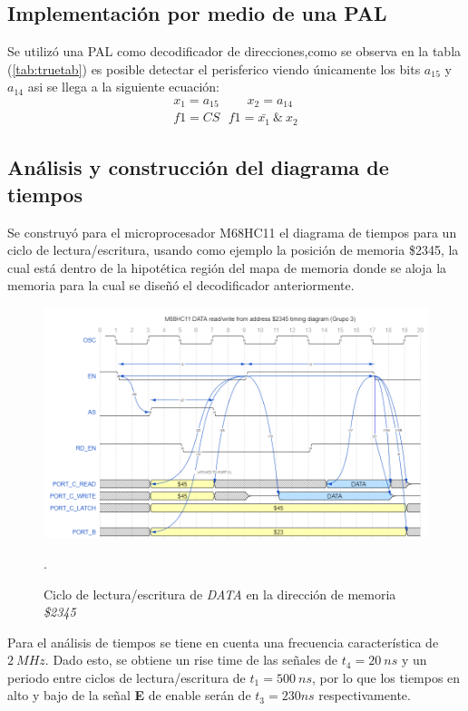 \subsection{Implementación por medio de una PAL}
Se utilizó una PAL como decodificador de direcciones,como se observa en la tabla (\ref{tab:truetab}) es posible detectar el perisferico viendo únicamente los bits $a_{15}$ y $a_{14}$ asi se llega a la siguiente ecuación:
\begin{align}
x_1 = a_{15} \ \ \  \  \  \  \  \  \  \ x_2=a_{14} \\
f1=CS \ \ \ f1= \bar{x_1} \  \&  \ x_2
\end{align}

\subsection{Análisis y construcción del diagrama de tiempos}
Se construyó para el microprocesador M68HC11 el diagrama de tiempos para un ciclo de lectura/escritura, usando como ejemplo la posición de memoria \$2345, la cual está dentro de la hipotética región del mapa de memoria donde se aloja la memoria para la cual se diseñó el decodificador anteriormente.

\begin{figure}[H]
  \centering
  \includegraphics[width=\textwidth]{ImagenesEjercicio1/diagtiempos.png}
  \caption{Ciclo de lectura/escritura de \textit{DATA} en la dirección de memoria \textit{\$2345}}.
  \label{diagtiempos}
\end{figure}
 
Para el análisis de tiempos se tiene en cuenta una frecuencia característica de $2 \ MHz$. Dado esto, se obtiene un rise time de las señales de $t_4 = 20 \ ns$ y un periodo entre ciclos de lectura/escritura de $t_1 = 500 \ ns$, por lo que los tiempos en alto y bajo de la señal \textbf{E} de enable serán de $t_3 = 230 ns$ respectivamente. 

